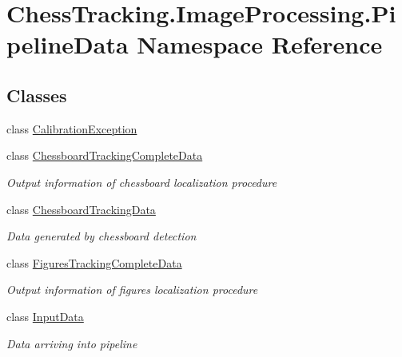 \hypertarget{namespace_chess_tracking_1_1_image_processing_1_1_pipeline_data}{}\section{Chess\+Tracking.\+Image\+Processing.\+Pipeline\+Data Namespace Reference}
\label{namespace_chess_tracking_1_1_image_processing_1_1_pipeline_data}
\subsection*{Classes}
\begin{DoxyCompactItemize}
\item 
class \mbox{\hyperlink{class_chess_tracking_1_1_image_processing_1_1_pipeline_data_1_1_calibration_exception}{Calibration\+Exception}}
\item 
class \mbox{\hyperlink{class_chess_tracking_1_1_image_processing_1_1_pipeline_data_1_1_chessboard_tracking_complete_data}{Chessboard\+Tracking\+Complete\+Data}}
\begin{DoxyCompactList}\small\item\em Output information of chessboard localization procedure \end{DoxyCompactList}\item 
class \mbox{\hyperlink{class_chess_tracking_1_1_image_processing_1_1_pipeline_data_1_1_chessboard_tracking_data}{Chessboard\+Tracking\+Data}}
\begin{DoxyCompactList}\small\item\em Data generated by chessboard detection \end{DoxyCompactList}\item 
class \mbox{\hyperlink{class_chess_tracking_1_1_image_processing_1_1_pipeline_data_1_1_figures_tracking_complete_data}{Figures\+Tracking\+Complete\+Data}}
\begin{DoxyCompactList}\small\item\em Output information of figures localization procedure \end{DoxyCompactList}\item 
class \mbox{\hyperlink{class_chess_tracking_1_1_image_processing_1_1_pipeline_data_1_1_input_data}{Input\+Data}}
\begin{DoxyCompactList}\small\item\em Data arriving into pipeline \end{DoxyCompactList}\item 

\end{DoxyCompactItemize}
